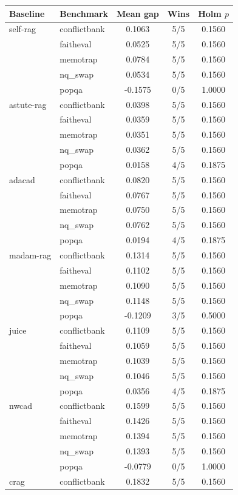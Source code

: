 \begin{tabular}{llccc}
\toprule
Baseline & Benchmark & Mean gap & Wins & Holm $p$ \\
\midrule
self-rag & conflictbank & 0.1063 & 5/5 & 0.1560 \\
 & faitheval & 0.0525 & 5/5 & 0.1560 \\
 & memotrap & 0.0784 & 5/5 & 0.1560 \\
 & nq_swap & 0.0534 & 5/5 & 0.1560 \\
 & popqa & -0.1575 & 0/5 & 1.0000 \\
astute-rag & conflictbank & 0.0398 & 5/5 & 0.1560 \\
 & faitheval & 0.0359 & 5/5 & 0.1560 \\
 & memotrap & 0.0351 & 5/5 & 0.1560 \\
 & nq_swap & 0.0362 & 5/5 & 0.1560 \\
 & popqa & 0.0158 & 4/5 & 0.1875 \\
adacad & conflictbank & 0.0820 & 5/5 & 0.1560 \\
 & faitheval & 0.0767 & 5/5 & 0.1560 \\
 & memotrap & 0.0750 & 5/5 & 0.1560 \\
 & nq_swap & 0.0762 & 5/5 & 0.1560 \\
 & popqa & 0.0194 & 4/5 & 0.1875 \\
madam-rag & conflictbank & 0.1314 & 5/5 & 0.1560 \\
 & faitheval & 0.1102 & 5/5 & 0.1560 \\
 & memotrap & 0.1090 & 5/5 & 0.1560 \\
 & nq_swap & 0.1148 & 5/5 & 0.1560 \\
 & popqa & -0.1209 & 3/5 & 0.5000 \\
juice & conflictbank & 0.1109 & 5/5 & 0.1560 \\
 & faitheval & 0.1059 & 5/5 & 0.1560 \\
 & memotrap & 0.1039 & 5/5 & 0.1560 \\
 & nq_swap & 0.1046 & 5/5 & 0.1560 \\
 & popqa & 0.0356 & 4/5 & 0.1875 \\
nwcad & conflictbank & 0.1599 & 5/5 & 0.1560 \\
 & faitheval & 0.1426 & 5/5 & 0.1560 \\
 & memotrap & 0.1394 & 5/5 & 0.1560 \\
 & nq_swap & 0.1393 & 5/5 & 0.1560 \\
 & popqa & -0.0779 & 0/5 & 1.0000 \\
crag & conflictbank & 0.1832 & 5/5 & 0.1560 \\

\end{tabular}
